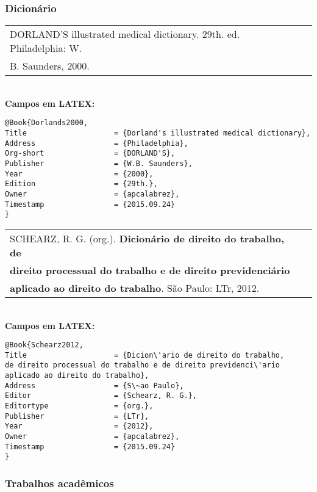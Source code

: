 \subsubsection{Dicion\'ario}

\begin{tabular}{|l|c|} \hline
	DORLAND'S illustrated medical dictionary. 29th. ed. Philadelphia: W.\\B. Saunders, 2000.   \\\hline
\end{tabular}\\


\textbf{Campos em LATEX:}

\begin{verbatim}
@Book{Dorlands2000,
Title                    = {Dorland's illustrated medical dictionary},
Address                  = {Philadelphia},
Org-short                = {DORLAND'S},
Publisher                = {W.B. Saunders},
Year                     = {2000},
Edition                  = {29th.},
Owner                    = {apcalabrez},
Timestamp                = {2015.09.24}
}
\end{verbatim}


\begin{tabular}{|l|c|} \hline
	SCHEARZ, R. G. (org.). \textbf{Dicion\'ario de direito do trabalho, de} \\ \textbf{direito processual do trabalho e de direito previdenci\'ario} \\ \textbf{aplicado ao direito do trabalho}. S\~ao Paulo: LTr, 2012.  \\\hline
\end{tabular}\\


\textbf{Campos em LATEX:}

\begin{verbatim}
@Book{Schearz2012,
Title                    = {Dicion\'ario de direito do trabalho, 
de direito processual do trabalho e de direito previdenci\'ario 
aplicado ao direito do trabalho},
Address                  = {S\~ao Paulo},
Editor                   = {Schearz, R. G.},
Editortype               = {org.},
Publisher                = {LTr},
Year                     = {2012},
Owner                    = {apcalabrez},
Timestamp                = {2015.09.24}
}
\end{verbatim}

\subsubsection{Trabalhos acad\^emicos}

